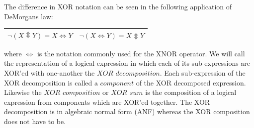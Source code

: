 \documentclass[10pt]{article}
\begin{document}
The difference in XOR notation can be seen in the following application of DeMorgans law:
\begin{center}
\begin{tabular}{|c|c|}
\hline
$\neg (X \Updownarrow Y) =  X \Leftrightarrow Y$ & $\neg (X \Leftrightarrow Y) =  X \Updownarrow  Y$ \\
\hline
\end{tabular}
\end{center}
where $\Leftrightarrow$ is the notation commonly used for the XNOR operator. We will call the representation of a logical expression in which each of its sub-expressions are XOR'ed with one-another the $\textit{XOR decomposition}$. Each sub-expression of the XOR decomposition is called a $\textit{component}$ of the XOR decomposed expression. Likewise the $\textit{XOR composition}$ or $\textit{XOR sum}$ is the composition of a logical expression from components which are XOR'ed together. The XOR decomposition is in algebraic normal form (ANF) whereas the XOR composition does not have to be.
\end{document}
